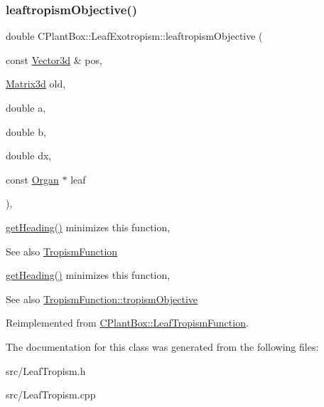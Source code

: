 \subsubsection{\texorpdfstring{leaftropism\+Objective()}{leaftropismObjective()}}
{\footnotesize\ttfamily double C\+Plant\+Box\+::\+Leaf\+Exotropism\+::leaftropism\+Objective (\begin{DoxyParamCaption}\item[{const \hyperlink{classCPlantBox_1_1Vector3d}{Vector3d} \&}]{pos,  }\item[{\hyperlink{classCPlantBox_1_1Matrix3d}{Matrix3d}}]{old,  }\item[{double}]{a,  }\item[{double}]{b,  }\item[{double}]{dx,  }\item[{const \hyperlink{classCPlantBox_1_1Organ}{Organ} $\ast$}]{leaf }\end{DoxyParamCaption})\hspace{0.3cm}{\ttfamily [override]}, {\ttfamily [virtual]}}



\hyperlink{classCPlantBox_1_1LeafTropismFunction_a1440868221a834474e34e3a503a74572}{get\+Heading()} minimizes this function, 

\begin{DoxySeeAlso}{See also}
\hyperlink{classCPlantBox_1_1TropismFunction}{Tropism\+Function}
\end{DoxySeeAlso}
\hyperlink{classCPlantBox_1_1LeafTropismFunction_a1440868221a834474e34e3a503a74572}{get\+Heading()} minimizes this function, \begin{DoxySeeAlso}{See also}
\hyperlink{classCPlantBox_1_1TropismFunction_a4f2c79fff55d1398c98a070dd8ebbe08}{Tropism\+Function\+::tropism\+Objective} 
\end{DoxySeeAlso}


Reimplemented from \hyperlink{classCPlantBox_1_1LeafTropismFunction_ab89f5f7e80103d80681bc8cadc220dba}{C\+Plant\+Box\+::\+Leaf\+Tropism\+Function}.



The documentation for this class was generated from the following files\+:\begin{DoxyCompactItemize}
\item 
src/Leaf\+Tropism.\+h\item 
src/Leaf\+Tropism.\+cpp\end{DoxyCompactItemize}
